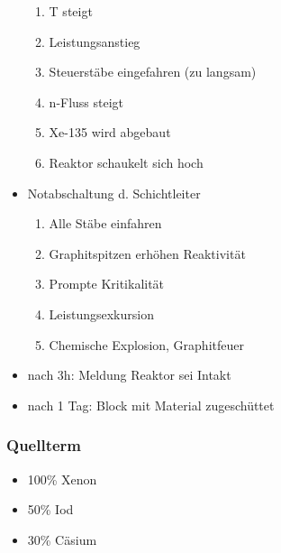 \documentclass[12pt]{article}
\begin{document}
\begin{itemize}
  \begin{enumerate}[label = \textrightarrow]
    \item T steigt
    \item Leistungsanstieg
    \item Steuerstäbe eingefahren (zu langsam)
    \item n-Fluss steigt
    \item Xe-135 wird abgebaut
    \item Reaktor schaukelt sich hoch
  \end{enumerate}
  \item Notabschaltung d. Schichtleiter
  \begin{enumerate}[label = \textrightarrow]
    \item Alle Stäbe einfahren
    \item Graphitspitzen erhöhen Reaktivität
    \item Prompte Kritikalität
    \item Leistungsexkursion
    \item Chemische Explosion, Graphitfeuer
  \end{enumerate}
  \item nach 3h: Meldung Reaktor sei Intakt
  \item nach 1 Tag: Block mit Material zugeschüttet

\end{itemize}

\subsubsection{Quellterm}
\begin{itemize}
  \item 100\% Xenon
  \item 50\% Iod
  \item 30\% Cäsium
\end{itemize}
\end{document}
